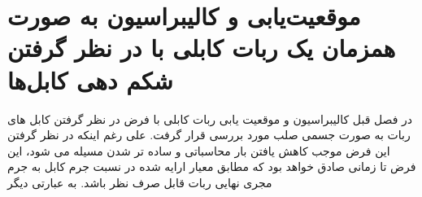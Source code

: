 \chapter{موقعیت‌یابی و کالیبراسیون به صورت همزمان یک ربات کابلی با در نظر گرفتن شکم دهی کابل‌ها }

در فصل قبل کالیبراسیون و موقعیت یابی ربات کابلی با فرض در نظر گرفتن کابل های ربات به صورت جسمی صلب مورد بررسی قرار گرفت.
علی رغم اینکه در نظر گرفتن این فرض موجب کاهش یافتن بار محاسباتی و ساده تر شدن مسیله می شود، این فرض تا زمانی صادق خواهد بود که مطابق معیار ارایه شده در
\cite{pott2013cable}
نسبت جرم کابل به جرم مجری نهایی ربات قابل صرف نظر باشد. به عبارتی دیگر 